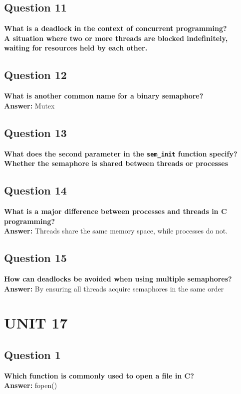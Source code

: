 \documentclass[11pt,parskip]{scrartcl}
\begin{document}
\subsection*{Question 11}
\textbf{What is a deadlock in the context of concurrent programming?} \\
\textbf{A situation where two or more threads are blocked indefinitely, waiting for resources held by each other.}

\subsection*{Question 12}
\textbf{What is another common name for a binary semaphore?} \\
\textbf{Answer:} Mutex

\subsection*{Question 13}
\textbf{What does the second parameter in the \texttt{sem\_init} function specify?} \\
\textbf{Whether the semaphore is shared between threads or processes}

\subsection*{Question 14}
\textbf{What is a major difference between processes and threads in C programming?} \\
\textbf{Answer:} Threads share the same memory space, while processes do not.

\subsection*{Question 15}
\textbf{How can deadlocks be avoided when using multiple semaphores?} \\
\textbf{Answer:} By ensuring all threads acquire semaphores in the same order

\section*{UNIT 17}

\subsection*{Question 1}
\textbf{Which function is commonly used to open a file in C?} \\
\textbf{Answer:} fopen()
\end{document}
